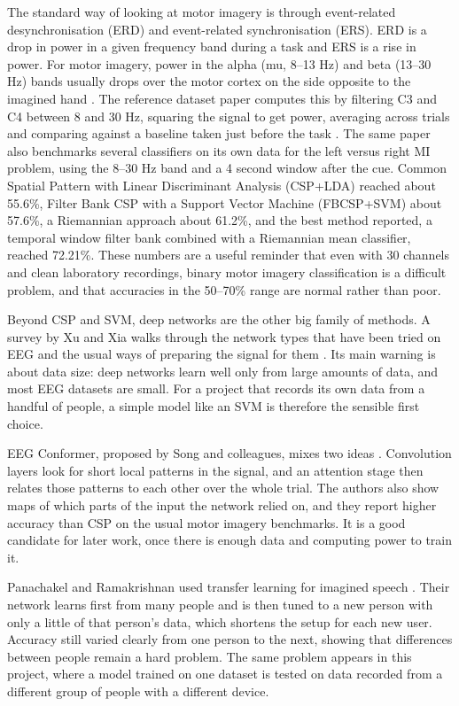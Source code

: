The standard way of looking at motor imagery is through event-related desynchronisation
(ERD) and event-related synchronisation (ERS). ERD is a drop in power in a given frequency
band during a task and ERS is a rise in power. For motor imagery, power in the alpha
(mu, 8--13 Hz) and beta (13--30 Hz) bands usually drops over the motor cortex on the side
opposite to the imagined hand \cite{pfurtscheller1999erd}. The reference dataset paper computes this by filtering C3
and C4 between 8 and 30 Hz, squaring the signal to get power, averaging across trials and
comparing against a baseline taken just before the task \cite{liu2024mi}. The same paper
also benchmarks several classifiers on its own data for the left versus right MI problem,
using the 8--30 Hz band and a 4 second window after the cue. Common Spatial Pattern with
Linear Discriminant Analysis (CSP+LDA) \cite{ramoser2000csp} reached about 55.6\%, Filter
Bank CSP with a Support Vector Machine (FBCSP+SVM) \cite{ang2012fbcsp, cortes1995svm}
about 57.6\%, a Riemannian approach \cite{barachant2012riemann} about 61.2\%, and the best
method reported, a temporal window filter bank combined with a Riemannian mean classifier,
reached 72.21\%. These numbers are a useful reminder that even with 30 channels and clean
laboratory recordings, binary motor imagery classification is a difficult problem, and that
accuracies in the 50--70\% range are normal rather than poor.

Beyond CSP and SVM, deep networks are the other big family of methods. A survey by Xu
and Xia walks through the network types that have been tried on EEG and the usual ways of
preparing the signal for them \cite{xu2023review}. Its main warning is about data size:
deep networks learn well only from large amounts of data, and most EEG datasets are small.
For a project that records its own data from a handful of people, a simple model like an
SVM is therefore the sensible first choice.

EEG Conformer, proposed by Song and colleagues, mixes two ideas
\cite{song2023conformer}. Convolution layers look for short local patterns in the signal,
and an attention stage then relates those patterns to each other over the whole trial. The
authors also show maps of which parts of the input the network relied on, and they report
higher accuracy than CSP on the usual motor imagery benchmarks. It is a good candidate for
later work, once there is enough data and computing power to train it.

Panachakel and Ramakrishnan used transfer learning for imagined speech
\cite{jerrin2021imagined}. Their network learns first from many people and is then tuned to
a new person with only a little of that person's data, which shortens the setup for each
new user. Accuracy still varied clearly from one person to the next, showing that
differences between people remain a hard problem. The
same problem appears in this project, where a model trained on one dataset is tested on
data recorded from a different group of people with a different device.

